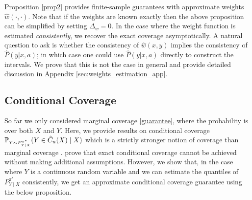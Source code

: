 Proposition \ref{prop2} provides finite-sample guarantees with approximate weights $\hat{w}(\cdot, \cdot)$. Note that if the weights are known exactly then the above proposition can be simplified by setting $\Delta_w =0$. In the case where the weight function is estimated \textit{consistently}, we recover the exact coverage asymptotically. A natural question to ask is whether the consistency of $\hat{w}(x, y)$ implies the consistency of $\hat{P}(y|x, a)$; in which case one could use $\hat{P}(y|x, a)$ directly to construct the intervals. We prove that this is not the case in general and provide detailed discussion in Appendix \ref{sec:weights_estimation_app}. 

\subsection{Conditional Coverage}\label{sec:cond_cov}
So far we only considered marginal coverage \eqref{guarantee}, where the probability is over both $X$ and $Y$. Here, we provide results on conditional coverage $\mathbb{P}_{Y \sim P^{\pi^*}_{Y \mid X}}(Y \in \hat{C}_n(X) \mid X)$ which is a strictly stronger notion of coverage than marginal coverage \citep{foygel2021limits}. \cite{vovk2012, lei2014distribution} prove that exact conditional coverage cannot be achieved without making additional assumptions. However, we show that, in the case where $Y$ is a continuous random variable and we can estimate the quantiles of $P^{\pi^*}_{Y \mid X}$ consistently, we get an approximate conditional coverage guarantee using the below proposition.

